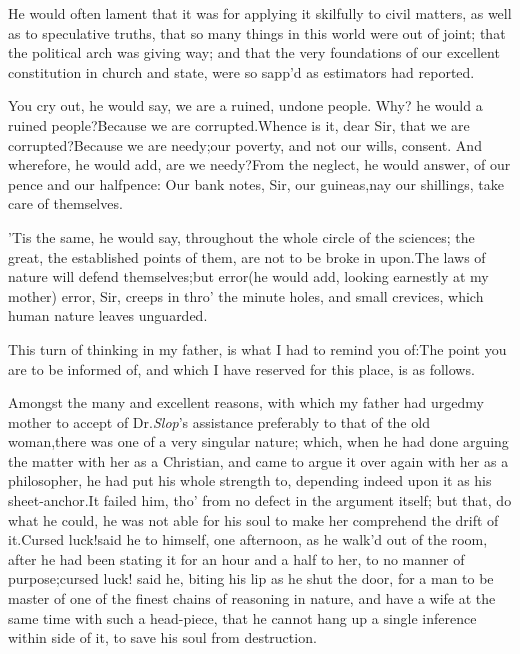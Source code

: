 \documentclass{article}
\begin{document}
He would often lament that it was for
applying it skilfully to civil matters, as well
as to speculative truths, that so many things in this world were
out of joint;\tsk\break
that the political arch was giving way;\tsk\pb
and that the very foundations of our excellent constitution in
church and state, were so sapp’d as estimators had reported.

You cry out, he would say, we are a ruined, undone people.\tsk
Why? he would 
a ruined people?\tsk Because we are
corrup\-ted.\tsk Whence is it, dear Sir, that we are
corrupted?\tsk Because we are needy;\tsk our
poverty, and not our wills, consent.\tsk\break
And wherefore, he would add, are we needy?\tsk From the neglect, he would answer,
of our pence and our halfpence:\tsk\break
Our bank notes, Sir, our guineas,\tsk nay our shillings,
take care of themselves.

’Tis the same, he would say, throughout the whole circle
of the sciences;\tsk\pb
the great, the established points of them, are not to be broke
in upon.\tsk The laws of nature will defend themselves;\tsk but
error\tsk (he would add, looking earnestly at my mother)\tsk
error, Sir, creeps in thro’ the minute holes, and small
crevices, which human nature leaves unguarded.

This turn of thinking in my father, is what I had to remind you
of:\tsk The point you are to be informed of, and which I have
reserved for this place, is as follows.

Amongst the many and excellent reasons, with which my father had
urged\break my mother to accept of Dr.\@ \textit{Slop}’s as\-sistance
preferably to that of the old wo\-man,\tsk there was one of a very
singular nature; which, when he had done arguing the matter with
her as a Christian,\break
and came to argue it over again with her\pb
as a philosopher, he had put his whole strength to, depending
indeed upon it as his sheet-anchor.\tsh It failed him, tho’ from
no defect in the argument itself; but that, do what he could, he
was not able for his soul to make her comprehend the drift of
it.\tsh Cursed luck!\tsh said he to himself, one afternoon, as
he walk’d out of the room, after he had been stating it for an
hour and a half to her, to no manner of purpose;\tsk cursed
luck! said he, biting his lip as he shut the door,\break
\tsk for a man
to be master of one of the finest chains of reasoning in
nature,\tsh\break
and have a wife at the same time with such a
head-piece, that he cannot hang up a single inference within
side of it, to save his soul from destruction.
\end{document}
